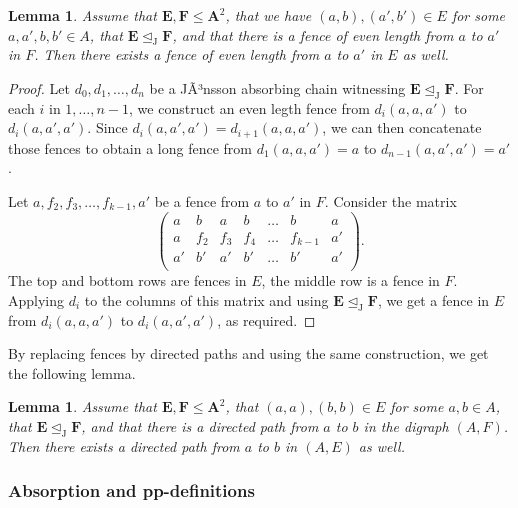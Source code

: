 \documentclass{amsart}
\theoremstyle{plain}
\newtheorem{lemma}[theorem]{Lemma}
\theoremstyle{definition}
\begin{document}
\begin{lemma}\label{lemFence}
  Assume that ${\mathbf{{E}}}, {\mathbf{{F}}} \leq {{\mathbf{A}}}^2$, that
  we have $(a,b),(a',b')\in E$ for some $a,a',b,b'\in A$, 
  that ${\mathbf{{E}}} \operatorname{\trianglelefteq_J} {\mathbf{{F}}}$, and that there is a
  fence of even length from $a$ to $a'$ in $F$. Then there exists 
  a fence of even length from $a$ to $a'$ in $E$ as well.
\end{lemma}
\begin{proof}
  Let $d_0,d_1,\dots,d_n$ be a JÃ³nsson absorbing chain witnessing ${\mathbf{{E}}} \operatorname{\trianglelefteq_J} {\mathbf{{F}}}$.
  For each $i$ in $1,\dots, n-1$, we construct an even legth fence from $d_i(a,a,a')$ to
  $d_i(a,a',a')$. Since $d_i(a,a',a')=d_{i+1}(a,a,a')$, we can then concatenate
  those fences to obtain a long fence from $d_1(a,a,a')=a$ to
  $d_{n-1}(a,a',a')=a'$.

  Let $a,f_2,f_3,\dots,f_{k-1},a'$ be a fence from $a$ to $a'$ in $F$. Consider the matrix
  \[
  \begin{pmatrix}
    a&b&a&b&\dots&b&a\\
    a&f_2&f_3&f_4&\dots&f_{k-1}&a'\\	
    a'&b'&a'&b'&\dots&b'&a'\\
  \end{pmatrix}.
\]
The top and bottom rows are fences in $E$, the middle row is a fence in $F$.
Applying $d_i$ to the columns of this matrix and using ${\mathbf{{E}}}\operatorname{\trianglelefteq_J} {\mathbf{{F}}}$, we get a
fence in $E$ from $d_i(a,a,a')$ to $d_i(a,a',a')$, as required.
\end{proof}

By replacing fences by directed paths and using the same construction, we get the
following lemma.

\begin{lemma}\label{lemDirectedConnectivity}
  Assume that ${\mathbf{{E}}},{\mathbf{{F}}}\leq {{\mathbf{A}}}^2$, that $(a,a),(b,b)\in E$ for some $a,b\in
  A$, that ${\mathbf{{E}}}\operatorname{\trianglelefteq_J} {\mathbf{{F}}}$, and that there is a
  directed path from $a$ to $b$ in the digraph $(A,F)$. Then there exists 
  a directed path from $a$ to $b$ in $(A,E)$ as well.
\end{lemma}

\subsubsection{Absorption and pp-definitions}
\end{document}
